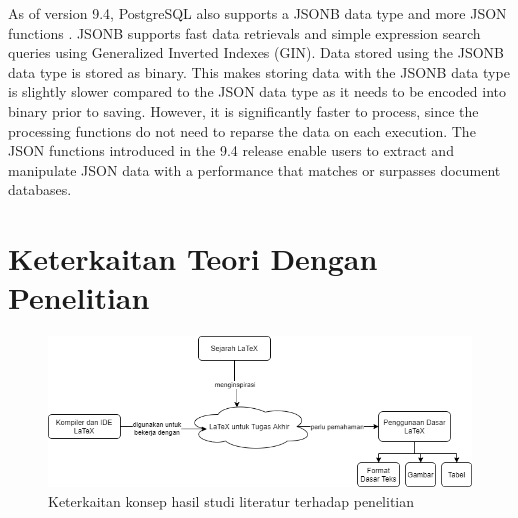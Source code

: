 As of version 9.4, PostgreSQL also supports a JSONB data type and more JSON
functions \cite{postgresql:9.4}. JSONB supports fast data retrievals and simple
expression search queries using Generalized Inverted Indexes (GIN). Data stored
using the JSONB data type is stored as binary. This makes storing data with the
JSONB data type is slightly slower compared to the JSON data type as it needs
to be encoded into binary prior to saving. However, it is significantly faster
to process, since the processing functions do not need to reparse the data on
each execution. The JSON functions introduced in the 9.4 release enable users
to extract and manipulate JSON data with a performance that matches or
surpasses document databases.

\section{Keterkaitan Teori Dengan Penelitian}

\begin{figure}
	\centering
	\includegraphics[width=\textwidth]{pics/research_concept_map.png}
	\caption{Keterkaitan konsep hasil studi literatur terhadap penelitian}
	\label{fig:research_concept_map}
\end{figure}

